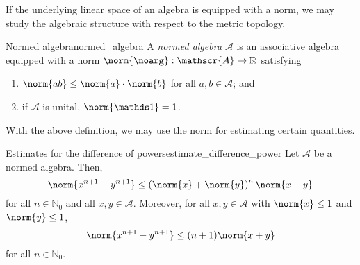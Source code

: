 If the underlying linear space of an algebra is equipped with a norm, we may study the algebraic structure with respect to the metric topology.
\begin{definition}{Normed algebra}{normed_algebra}
    A \emph{normed algebra} \(\mathscr{A}\) is an associative algebra equipped with a norm \(\norm{\noarg} : \mathscr{A} \to \mathbb{R}\) satisfying
    \begin{enumerate}[label=(\alph*)]
        \item \(\norm{ab} \leq \norm{a}\cdot\norm{b}\) for all \(a,b \in \mathscr{A}\); and
        \item if \(\mathscr{A}\) is unital, \(\norm{\unity} = 1\).
    \end{enumerate}
\end{definition}
With the above definition, we may use the norm for estimating certain quantities.
\begin{lemma}{Estimates for the difference of powers}{estimate_difference_power}
    Let \(\mathscr{A}\) be a normed algebra. Then,
    \begin{equation*}
        \norm{x^{n+1} - y^{n+1}}\leq \left(\norm{x} + \norm{y}\right)^n \norm{x-y}
    \end{equation*}
    for all \(n \in \mathbb{N}_0\) and all \(x,y \in \mathscr{A}\). Moreover, for all \(x, y \in \mathscr{A}\) with \(\norm{x} \leq 1\) and \(\norm{y} \leq 1\),
    \begin{equation*}
        \norm{x^{n+1} - y^{n+1}} \leq (n+1)\norm{x+y}
    \end{equation*}
    for all \(n \in \mathbb{N}_0\).
\end{lemma}

